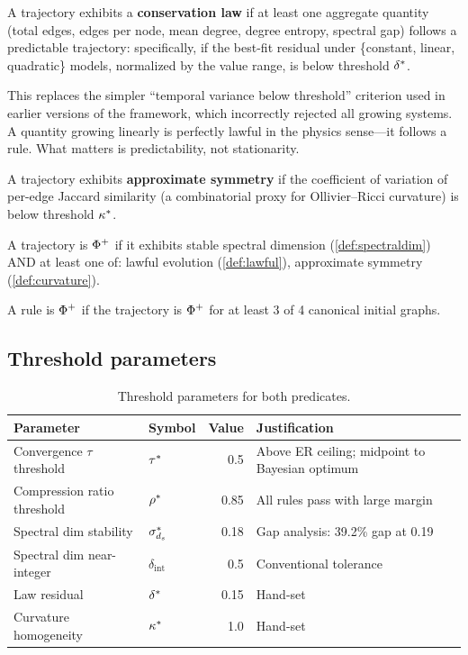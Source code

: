\documentclass{../shared/primo}
\begin{document}
\begin{definition}\label{def:lawful}
A trajectory exhibits a \textbf{conservation law} if at least one aggregate quantity (total edges, edges per node, mean degree, degree entropy, spectral gap) follows a predictable trajectory: specifically, if the best-fit residual under \{constant, linear, quadratic\} models, normalized by the value range, is below threshold $\delta^*$.
\end{definition}

\begin{remark}
This replaces the simpler ``temporal variance below threshold'' criterion used in earlier versions of the framework, which incorrectly rejected all growing systems. A quantity growing linearly is perfectly lawful in the physics sense---it follows a rule. What matters is predictability, not stationarity.
\end{remark}

\begin{definition}\label{def:curvature}
A trajectory exhibits \textbf{approximate symmetry} if the coefficient of variation of per-edge Jaccard similarity (a combinatorial proxy for Ollivier--Ricci curvature) is below threshold $\kappa^*$.
\end{definition}

\begin{definition}[$\Phipos$]\label{def:phipos}
A trajectory is $\Phipos$ if it exhibits stable spectral dimension (\cref{def:spectraldim}) AND at least one of: lawful evolution (\cref{def:lawful}), approximate symmetry (\cref{def:curvature}).

A rule is $\Phipos$ if the trajectory is $\Phipos$ for at least 3 of 4 canonical initial graphs.
\end{definition}

\subsection{Threshold parameters}

\begin{table}[ht]
\centering
\begin{tabular}{llrl}
\toprule
Parameter & Symbol & Value & Justification \\
\midrule
Convergence $\tau$ threshold & $\tau^*$ & 0.5 & Above ER ceiling; midpoint to Bayesian optimum \\
Compression ratio threshold & $\rho^*$ & 0.85 & All rules pass with large margin \\
Spectral dim stability & $\sigma^*_{d_s}$ & 0.18 & Gap analysis: 39.2\% gap at 0.19 \\
Spectral dim near-integer & $\delta_{\mathrm{int}}$ & 0.5 & Conventional tolerance \\
Law residual & $\delta^*$ & 0.15 & Hand-set \\
Curvature homogeneity & $\kappa^*$ & 1.0 & Hand-set \\
\bottomrule
\end{tabular}
\caption{Threshold parameters for both predicates.}
\label{tab:thresholds}
\end{table}
\end{document}
